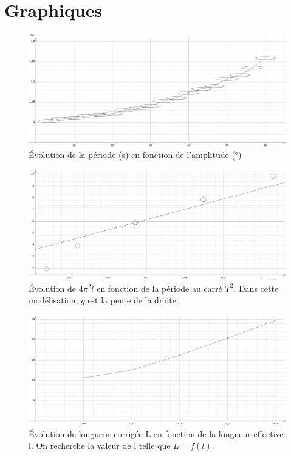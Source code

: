 \documentclass[a4paper,10pt,french]{scrartcl}
\begin{document}
\section{Graphiques}
\begin{figure}[H]
\begin{center}
 \includegraphics[scale=0.3]{graph_1}
 \end{center}
 \caption{Évolution de la période (s) en fonction de l'amplitude (°)}
\end{figure}
\begin{figure}[H]
 \begin{center}
 \includegraphics[scale=0.3]{graph_2}
 \end{center}
 \caption{Évolution de \(4\pi^2l\) en fonction de la période au carré \(T^2\). Dans cette modélisation, \(g\)  est la pente de la droite.}
\end{figure}
\begin{figure}[H]
 \begin{center}
 \includegraphics[scale=0.3]{graph_3}
 \end{center}
 \caption{Évolution de longueur corrigée L en fonction de la longueur effective l. On recherche la valeur de l telle que \(L = f(l)\).}
\end{figure}
\end{document}

